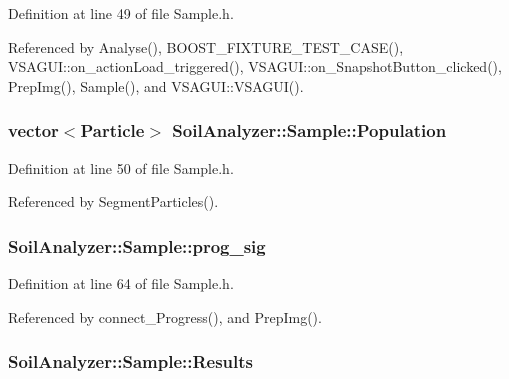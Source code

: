 Definition at line 49 of file Sample.\+h.



Referenced by Analyse(), B\+O\+O\+S\+T\+\_\+\+F\+I\+X\+T\+U\+R\+E\+\_\+\+T\+E\+S\+T\+\_\+\+C\+A\+S\+E(), V\+S\+A\+G\+U\+I\+::on\+\_\+action\+Load\+\_\+triggered(), V\+S\+A\+G\+U\+I\+::on\+\_\+\+Snapshot\+Button\+\_\+clicked(), Prep\+Img(), Sample(), and V\+S\+A\+G\+U\+I\+::\+V\+S\+A\+G\+U\+I().

\hypertarget{class_soil_analyzer_1_1_sample_ab87a190f2b4a49bc71b355f9c52d8aa4}{}
\subsubsection[{Population}]{\setlength{\rightskip}{0pt plus 5cm}vector$<${\bf Particle}$>$ Soil\+Analyzer\+::\+Sample\+::\+Population}\label{class_soil_analyzer_1_1_sample_ab87a190f2b4a49bc71b355f9c52d8aa4}


Definition at line 50 of file Sample.\+h.



Referenced by Segment\+Particles().

\hypertarget{class_soil_analyzer_1_1_sample_aab3a7522152890650245a1f069605a13}{}
\subsubsection[{prog\+\_\+sig}]{ Soil\+Analyzer\+::\+Sample\+::prog\+\_\+sig\hspace{0.3cm}{\ttfamily [private]}}\label{class_soil_analyzer_1_1_sample_aab3a7522152890650245a1f069605a13}


Definition at line 64 of file Sample.\+h.



Referenced by connect\+\_\+\+Progress(), and Prep\+Img().

\hypertarget{class_soil_analyzer_1_1_sample_ab242ae1c2f229168fd630a9f31d7237f}{}
\subsubsection[{Results}]{ Soil\+Analyzer\+::\+Sample\+::\+Results}\label{class_soil_analyzer_1_1_sample_ab242ae1c2f229168fd630a9f31d7237f}


